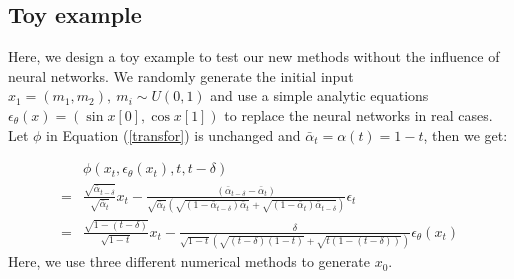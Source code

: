 \documentclass{article}
\begin{document}
\subsection{Toy example}
\label{sec_toy}

Here, we design a toy example to test our new methods without the influence of neural networks. We randomly generate the initial input $x_1 = (m_1, m_2),\ m_i\sim U(0, 1)$ and use a simple analytic equations $\epsilon_\theta(x)=(\sin x[0], \cos x[1])$ to replace the neural networks in real cases. Let $\phi$ in Equation (\ref{transfor}) is unchanged and $\bar{\alpha}_t=\alpha(t)=1-t$, then we get:

\begin{equation}
   \begin{split}
      &\phi(x_t, \epsilon_\theta(x_t), t, t-\delta) \\
      = &\frac{\sqrt{\bar{\alpha}_{t-\delta}}}{\sqrt{\bar{\alpha}_t}}x_t - 
      \frac{(\bar{\alpha}_{t-\delta}-\bar{\alpha}_t)}{\sqrt{\bar{\alpha}_t}(\sqrt{(1-\bar{\alpha}_{t-\delta})\bar{\alpha}_{t}} + \sqrt{(1-\bar{\alpha}_{t})\bar{\alpha}_{t-\delta}})}\epsilon_t \\
      = &\frac{\sqrt{1-(t-\delta)}}{\sqrt{1-t}}x_t - 
       \frac{\delta}{\sqrt{1-t}\left(\sqrt{(t-\delta)(1-t)} + \sqrt{t(1-(t-\delta))}\right)}\epsilon_\theta(x_t)
   \end{split}
\end{equation}
Here, we use three different numerical methods to generate $x_0$. 
\end{document}
